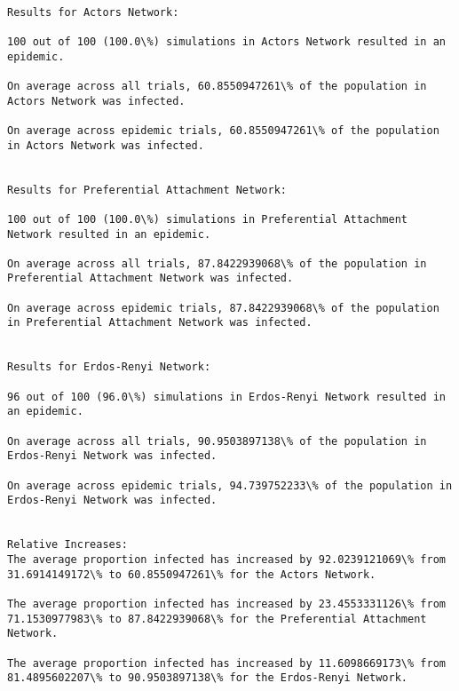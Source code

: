 \documentclass[11pt]{article}
\begin{document}
    \begin{Verbatim}[commandchars=\\\{\}]

Results for Actors Network:

100 out of 100 (100.0\%) simulations in Actors Network resulted in an epidemic.

On average across all trials, 60.8550947261\% of the population in Actors Network was infected.

On average across epidemic trials, 60.8550947261\% of the population in Actors Network was infected.


Results for Preferential Attachment Network:

100 out of 100 (100.0\%) simulations in Preferential Attachment Network resulted in an epidemic.

On average across all trials, 87.8422939068\% of the population in Preferential Attachment Network was infected.

On average across epidemic trials, 87.8422939068\% of the population in Preferential Attachment Network was infected.


Results for Erdos-Renyi Network:

96 out of 100 (96.0\%) simulations in Erdos-Renyi Network resulted in an epidemic.

On average across all trials, 90.9503897138\% of the population in Erdos-Renyi Network was infected.

On average across epidemic trials, 94.739752233\% of the population in Erdos-Renyi Network was infected.


Relative Increases:
The average proportion infected has increased by 92.0239121069\% from 31.6914149172\% to 60.8550947261\% for the Actors Network.

The average proportion infected has increased by 23.4553331126\% from 71.1530977983\% to 87.8422939068\% for the Preferential Attachment Network.

The average proportion infected has increased by 11.6098669173\% from 81.4895602207\% to 90.9503897138\% for the Erdos-Renyi Network.


    \end{Verbatim}
\end{document}
